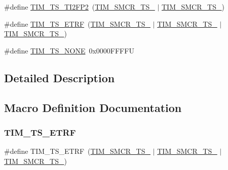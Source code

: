 \begin{DoxyCompactItemize}
\item 
\#define \hyperlink{group___t_i_m___trigger___selection_ga0ed58a269bccd3f22d19cc9a2ba3123f}{T\+I\+M\+\_\+\+T\+S\+\_\+\+T\+I2\+F\+P2}~(\hyperlink{group___peripheral___registers___bits___definition_gacb82212fcc89166a43ff97542da9182d}{T\+I\+M\+\_\+\+S\+M\+C\+R\+\_\+\+T\+S\+\_} $\vert$ \hyperlink{group___peripheral___registers___bits___definition_gacf0dbaf4a2ec8759f283f82a958ef6a8}{T\+I\+M\+\_\+\+S\+M\+C\+R\+\_\+\+T\+S\+\_})
\item 
\#define \hyperlink{group___t_i_m___trigger___selection_gaece08e02e056613a882aa7ff0a6ccc2d}{T\+I\+M\+\_\+\+T\+S\+\_\+\+E\+T\+RF}~(\hyperlink{group___peripheral___registers___bits___definition_ga8d1f040f9259acb3c2fba7b0c7eb3d96}{T\+I\+M\+\_\+\+S\+M\+C\+R\+\_\+\+T\+S\+\_} $\vert$ \hyperlink{group___peripheral___registers___bits___definition_gacb82212fcc89166a43ff97542da9182d}{T\+I\+M\+\_\+\+S\+M\+C\+R\+\_\+\+T\+S\+\_} $\vert$ \hyperlink{group___peripheral___registers___bits___definition_gacf0dbaf4a2ec8759f283f82a958ef6a8}{T\+I\+M\+\_\+\+S\+M\+C\+R\+\_\+\+T\+S\+\_})
\item 
\#define \hyperlink{group___t_i_m___trigger___selection_ga257bee9dc9f2f71a73124dd8c2329480}{T\+I\+M\+\_\+\+T\+S\+\_\+\+N\+O\+NE}~0x0000\+F\+F\+F\+FU
\end{DoxyCompactItemize}


\subsection{Detailed Description}


\subsection{Macro Definition Documentation}
\mbox{\label{group___t_i_m___trigger___selection_gaece08e02e056613a882aa7ff0a6ccc2d}} 
\subsubsection{\texorpdfstring{T\+I\+M\+\_\+\+T\+S\+\_\+\+E\+T\+RF}{TIM\_TS\_ETRF}}
{\footnotesize\ttfamily \#define T\+I\+M\+\_\+\+T\+S\+\_\+\+E\+T\+RF~(\hyperlink{group___peripheral___registers___bits___definition_ga8d1f040f9259acb3c2fba7b0c7eb3d96}{T\+I\+M\+\_\+\+S\+M\+C\+R\+\_\+\+T\+S\+\_} $\vert$ \hyperlink{group___peripheral___registers___bits___definition_gacb82212fcc89166a43ff97542da9182d}{T\+I\+M\+\_\+\+S\+M\+C\+R\+\_\+\+T\+S\+\_} $\vert$ \hyperlink{group___peripheral___registers___bits___definition_gacf0dbaf4a2ec8759f283f82a958ef6a8}{T\+I\+M\+\_\+\+S\+M\+C\+R\+\_\+\+T\+S\+\_})}

